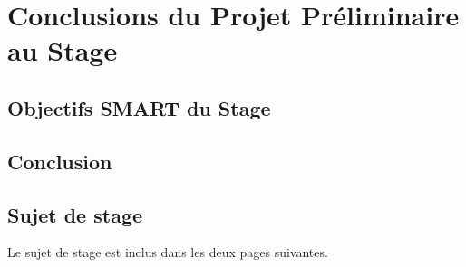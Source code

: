 \documentclass[12pt,a4paper]{report}
\begin{document}
\part{Conclusions du Projet Préliminaire au Stage}
  
\chapter{Objectifs SMART du Stage}
\chapter{Conclusion}

\begin{appendix}
\chapter{Sujet de stage}
Le sujet de stage est inclus dans les deux pages suivantes.

\end{appendix}



\end{document}
